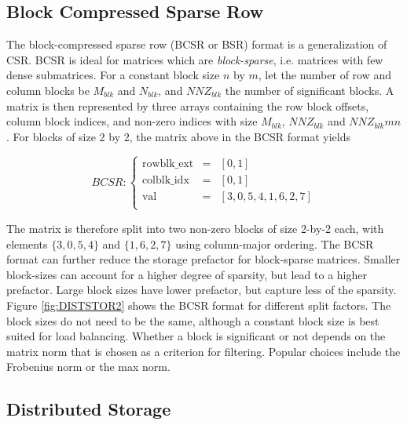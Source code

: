 \subsection{Block Compressed Sparse Row}

The block-compressed sparse row (BCSR or BSR) format is a generalization of CSR. BCSR is ideal for matrices which are \emph{block-sparse}, i.e. matrices with few dense submatrices. For a constant block size $n$ by $m$, let the number of row and column blocks be $M_{blk}$ and $N_{blk}$, and $NNZ_{blk}$ the number of significant blocks. A matrix is then represented by three arrays containing the row block offsets, column block indices, and non-zero indices with size $M_{blk}$, $NNZ_{blk}$ and $NNZ_{blk}mn$. For blocks of size 2 by 2, the matrix above in the BCSR format yields

\begin{equation*}
BCSR: \left\lbrace
\begin{array}{lll}
\textrm{rowblk\_ext} &= &\left[ 0, 1 \right] \\
\textrm{colblk\_idx} &= &\left[ 0, 1 \right] \\
\textrm{val}  &= &\left[ 3, 0, 5, 4, 1, 6, 2, 7 \right] \\
\end{array}
\right.
\end{equation*}

\noindent The matrix is therefore split into two non-zero blocks of size 2-by-2 each, with elements $\{3,0,5,4\}$ and $\{1,6,2,7\}$ using column-major ordering. The BCSR format can further reduce the storage prefactor for block-sparse matrices. Smaller block-sizes can account for a higher degree of sparsity, but lead to a higher prefactor. Large block sizes have lower prefactor, but capture less of the sparsity. Figure \ref{fig:DISTSTOR2} shows the BCSR format for different split factors. The block sizes do not need to be the same, although a constant block size is best suited for load balancing. Whether a block is significant or not depends on the matrix norm that is chosen as a criterion for filtering. Popular choices include the Frobenius norm or the max norm. 

\subsection{Distributed Storage}

